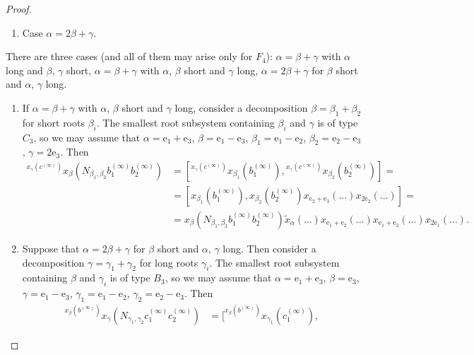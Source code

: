 \documentclass{article}
\numberwithin{equation}{section}
\theoremstyle{definition}
\theoremstyle{remark}
\newcommand{\up}[2]{{^{#1}\!{#2}}}
\begin{document}
\begin{proof}
\begin{enumerate}
 \item Case $\alpha = 2\beta + \gamma$.
\end{enumerate}


There are three cases (and all of them may arise only for \(F_4\)): \(\alpha = \beta + \gamma\) with \(\alpha\) long and \(\beta\), \(\gamma\) short, \(\alpha = \beta + \gamma\) with \(\alpha\), \(\beta\) short and \(\gamma\) long, \(\alpha = 2\beta + \gamma\) for \(\beta\) short and \(\alpha\), \(\gamma\) long.

\begin{enumerate}
 \item If \(\alpha = \beta + \gamma\) with \(\alpha\), \(\beta\) short and \(\gamma\) long, consider a decomposition \(\beta = \beta_1 + \beta_2\) for short roots \(\beta_i\). The smallest root subsystem containing \(\beta_i\) and \(\gamma\) is of type \(C_3\), so we may assume that \(\alpha = \mathrm e_1 + \mathrm e_3\), \(\beta = \mathrm e_1 - \mathrm e_3\), \(\beta_1 = \mathrm e_1 - \mathrm e_2\), \(\beta_2 = \mathrm e_2 - \mathrm e_3\), \(\gamma = 2\mathrm e_3\). Then
 \begin{align*}
  \up{x_\gamma(c^{(\infty)})}
   {x_\beta(N_{\beta_1, \beta_2} b_1^{(\infty)} b_2^{(\infty)})}
  &= [\up{x_\gamma(c^{(\infty)})}
   {x_{\beta_1}(b_1^{(\infty)})},
  \up{x_\gamma(c^{(\infty)})}
   {x_{\beta_2}(b_2^{(\infty)})}] =\\
  &= [x_{\beta_1}(b_1^{(\infty)}),
  x_{\beta_2}(b_2^{(\infty)})
  x_{\mathrm e_2 + \mathrm e_3}(\ldots)
  x_{2\mathrm e_2}(\ldots)] =\\
  &= x_\beta(N_{\beta_1, \beta_2} b_1^{(\infty)} b_2^{(\infty)})
  \widetilde x_\alpha(\ldots)
  x_{\mathrm e_1 + \mathrm e_2}(\ldots)
  x_{\mathrm e_1 + \mathrm e_2}(\ldots)
  x_{2\mathrm e_1}(\ldots).
 \end{align*}
 \item Suppose that \(\alpha = 2\beta + \gamma\) for \(\beta\) short and \(\alpha\), \(\gamma\) long. Then consider a decomposition \(\gamma = \gamma_1 + \gamma_2\) for long roots \(\gamma_i\). The smallest root subsystem containing \(\beta\) and \(\gamma_i\) is of type \(B_3\), so we may assume that \(\alpha = \mathrm e_1 + \mathrm e_3\), \(\beta = \mathrm e_3\), \(\gamma = \mathrm e_1 - \mathrm e_3\), \(\gamma_1 = \mathrm e_1 - \mathrm e_2\), \(\gamma_2 = \mathrm e_2 - \mathrm e_3\). Then
 \begin{align*}
  \up{x_\beta(b^{(\infty)})}
   {x_\gamma(N_{\gamma_1, \gamma_2} c_1^{(\infty)} c_2^{(\infty)})}
  &= [\up{x_\beta(b^{(\infty)})}
   {x_{\gamma_1}(c_1^{(\infty)})},

\end{align*}
\end{enumerate}
\end{proof}
\end{document}
